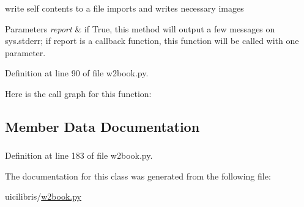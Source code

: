 write self contents to a file imports and writes necessary images 


\begin{DoxyParams}{\-Parameters}
{\em report} & if \-True, this method will output a few messages on sys.\-stderr; if report is a callback function, this function will be called with one parameter. \\
\hline
\end{DoxyParams}


\-Definition at line 90 of file w2book.\-py.



\-Here is the call graph for this function\-:




\subsection{\-Member \-Data \-Documentation}
\hypertarget{classuicilibris_1_1w2book_1_1wiki2_ab1461398f11b498a73d850d22220fca4}{
\subsubsection[{state}]{}}\label{classuicilibris_1_1w2book_1_1wiki2_ab1461398f11b498a73d850d22220fca4}


\-Definition at line 183 of file w2book.\-py.



\-The documentation for this class was generated from the following file\-:\begin{DoxyCompactItemize}
\item 
uicilibris/\hyperlink{w2book_8py}{w2book.\-py}\end{DoxyCompactItemize}
